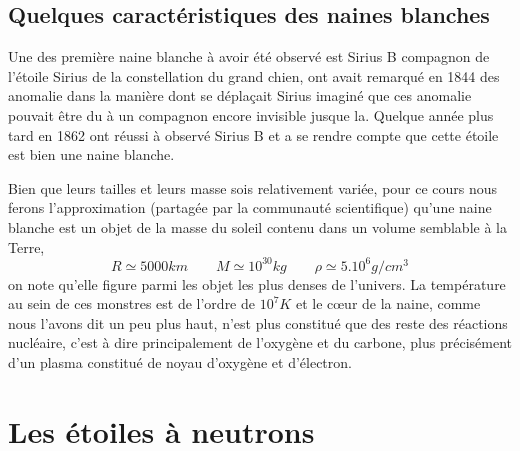 \documentclass[11pt]{book} %
\begin{document}
\subsection{Quelques caractéristiques des naines blanches}
Une des première naine blanche à avoir été observé est Sirius B compagnon de l'étoile Sirius de la constellation du grand chien, ont avait remarqué en 1844 des anomalie dans la manière dont se déplaçait Sirius imaginé que ces anomalie pouvait être du à un compagnon encore invisible jusque la. Quelque année plus tard en 1862 ont réussi à observé Sirius B et a se rendre compte que cette étoile est bien une naine blanche.
\n

Bien que leurs tailles et leurs masse sois relativement variée, pour ce cours nous ferons l'approximation (partagée par la communauté scientifique) qu'une naine blanche
est un objet de la masse du soleil contenu dans un volume semblable à la Terre,
$$R\simeq 5000km\qquad M\simeq 10^{30}kg\qquad \rho\simeq 5.10^{6}g/cm^3$$
on note qu'elle figure parmi les objet les plus denses de l'univers.
La température au sein de ces monstres est de l'ordre de $10^7 K$ et le cœur de la naine, comme nous l'avons dit un peu plus haut, n'est plus constitué que des reste des réactions nucléaire, c'est à dire principalement de l'oxygène et du carbone, plus précisément d'un plasma constitué de noyau d'oxygène et d'électron.

\section{Les étoiles à neutrons}
\end{document}
